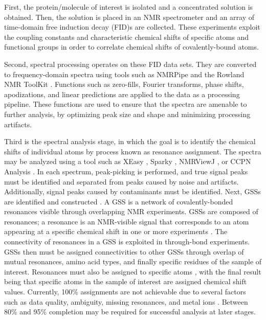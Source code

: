 First, the protein/molecule of interest is isolated and a concentrated solution 
is obtained.  Then, the solution is placed in an NMR spectrometer and an array 
of time-domain free induction decay (FID)s are collected.  These experiments 
exploit the coupling constants and characteristic chemical shifts of specific 
atoms and functional groups in order to correlate chemical shifts of 
covalently-bound atoms.

Second, spectral processing operates on these FID data sets.  They are 
converted to frequency-domain spectra using tools such as NMRPipe \cite{nmrpipe}
and the Rowland NMR ToolKit \cite{rnmrtk}.  Functions such as 
zero-fills, Fourier transforms, phase shifts, apodizations, and linear 
predictions are applied to the data as a processing pipeline.  These 
functions are used to ensure that the spectra are amenable to further 
analysis, by optimizing peak size and shape and minimizing processing 
artifacts.

Third is the spectral analysis stage, in which the goal is to identify the 
chemical shifts of individual atoms by process known as resonance assignment.
The spectra may be analyzed using a tool such as XEasy \cite{xeasy}, 
Sparky \cite{sparky}, NMRViewJ \cite{nmrviewj}, or CCPN Analysis \cite{ccpn}.  
In each spectrum, peak-picking is performed, and true signal peaks must 
be identified and separated from peaks caused by noise and artifacts.  
Additionally, signal peaks caused by contaminants must be identified.  
Next, GSSs are identified and constructed \cite{ccpn}. 
A GSS is a network of covalently-bonded resonances visible through 
overlapping NMR experiments.  GSSs are composed of resonances; a 
resonance is an NMR-visible signal that corresponds to an atom appearing 
at a specific chemical shift in one or more experiments \cite{ccpn}.  
The connectivity of resonances in a GSS is exploited 
in through-bond experiments.  GSSs then must be assigned 
connectivities to other GSSs through overlap of mutual resonances, 
amino acid types, and finally specific residues of the sample of interest. 
Resonances must also be assigned to specific atoms \cite{ccpn}, 
with the final result being that specific atoms in the sample of interest 
are assigned chemical shift values.  Currently, 100\% assignments are not 
achievable due to several factors such as data quality, ambiguity,
missing resonances, and metal ions \cite{guerry2011automated}.
Between 80\% and 95\% completion may be required \cite{williamson2009automated}
for successful analysis at later stages.

